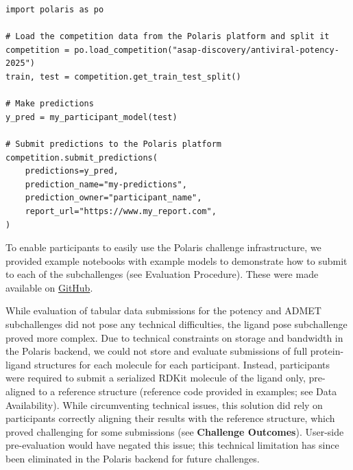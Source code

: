 \documentclass[journal=jcim,manuscript=article]{achemso}
\newenvironment{code}{\captionsetup{type=listing}}{}
\begin{document}
\begin{code}
\label{code:submission}
\begin{verbatim}
import polaris as po

# Load the competition data from the Polaris platform and split it
competition = po.load_competition("asap-discovery/antiviral-potency-2025")
train, test = competition.get_train_test_split()

# Make predictions
y_pred = my_participant_model(test)

# Submit predictions to the Polaris platform
competition.submit_predictions(
    predictions=y_pred,
    prediction_name="my-predictions",
    prediction_owner="participant_name",
    report_url="https://www.my_report.com",
)
\end{verbatim}
\end{code}


To enable participants to easily use the Polaris challenge infrastructure, we provided example notebooks with example models to demonstrate how to submit to each of the subchallenges (see Evaluation Procedure). These were made available on \href{https://github.com/asapdiscovery/asap-polaris-blind-challenge-examples}{GitHub}. 

While evaluation of tabular data submissions for the potency and ADMET subchallenges did not pose any technical difficulties, the ligand pose subchallenge proved more complex. Due to technical constraints on storage and bandwidth in the Polaris backend, we could not store and evaluate submissions of full protein-ligand structures for each molecule for each participant. Instead, participants were required to submit a serialized RDKit molecule of the ligand only, pre-aligned to a reference structure (reference code provided in examples; see Data Availability). While circumventing technical issues, this solution did rely on participants correctly aligning their results with the reference structure, which proved challenging for some submissions (see \textbf{Challenge Outcomes}). User-side pre-evaluation would have negated this issue; this technical limitation has since been eliminated in the Polaris backend for future challenges.
\end{document}
